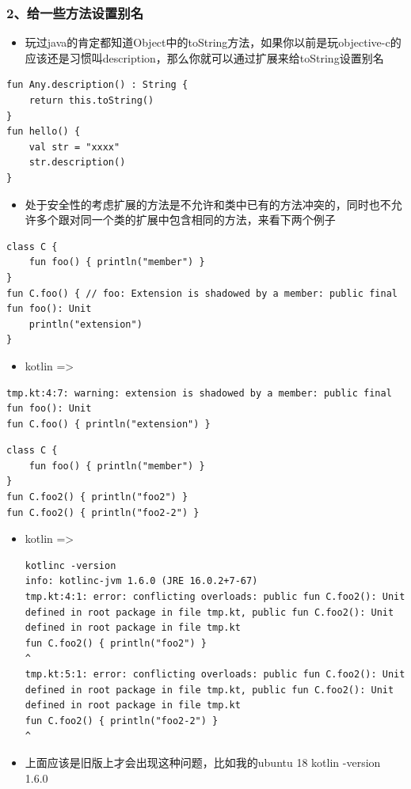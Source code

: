 \documentclass[9pt, b5paper]{article}
\begin{document}
\subsubsection{2、给一些方法设置别名}
\label{sec-7-7-2}
\begin{itemize}
\item 玩过java的肯定都知道Object中的toString方法，如果你以前是玩objective-c的应该还是习惯叫description，那么你就可以通过扩展来给toString设置别名
\end{itemize}
\begin{verbatim}
fun Any.description() : String {
    return this.toString()
}
fun hello() {
    val str = "xxxx"
    str.description()
}
\end{verbatim}
\begin{itemize}
\item 处于安全性的考虑扩展的方法是不允许和类中已有的方法冲突的，同时也不允许多个跟对同一个类的扩展中包含相同的方法，来看下两个例子
\end{itemize}
\begin{verbatim}
class C {
    fun foo() { println("member") }
}
fun C.foo() { // foo: Extension is shadowed by a member: public final fun foo(): Unit
    println("extension") 
}
\end{verbatim}
\begin{itemize}
\item kotlin =>
\end{itemize}
\begin{verbatim}
tmp.kt:4:7: warning: extension is shadowed by a member: public final fun foo(): Unit
fun C.foo() { println("extension") }
\end{verbatim}
\begin{verbatim}
class C {
    fun foo() { println("member") }
}
fun C.foo2() { println("foo2") }
fun C.foo2() { println("foo2-2") }
\end{verbatim}
\begin{itemize}
\item kotlin =>
\begin{verbatim}
kotlinc -version
info: kotlinc-jvm 1.6.0 (JRE 16.0.2+7-67)
tmp.kt:4:1: error: conflicting overloads: public fun C.foo2(): Unit defined in root package in file tmp.kt, public fun C.foo2(): Unit defined in root package in file tmp.kt
fun C.foo2() { println("foo2") }
^
tmp.kt:5:1: error: conflicting overloads: public fun C.foo2(): Unit defined in root package in file tmp.kt, public fun C.foo2(): Unit defined in root package in file tmp.kt
fun C.foo2() { println("foo2-2") }
^
\end{verbatim}
\item 上面应该是旧版上才会出现这种问题，比如我的ubuntu 18 kotlin -version 1.6.0
\end{itemize}
\end{document}
